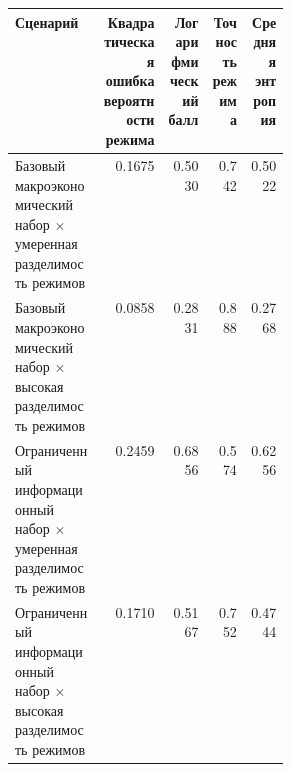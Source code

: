 \begin{tabular}{p{0.32\linewidth}rrrr}
\toprule
Сценарий & Квадратическая ошибка вероятности режима & Логарифмический балл & Точность режима & Средняя энтропия \\
\midrule
Базовый макроэкономический набор × умеренная разделимость режимов & 0.1675 & 0.5030 & 0.742 & 0.5022 \\
Базовый макроэкономический набор × высокая разделимость режимов & 0.0858 & 0.2831 & 0.888 & 0.2768 \\
Ограниченный информационный набор × умеренная разделимость режимов & 0.2459 & 0.6856 & 0.574 & 0.6256 \\
Ограниченный информационный набор × высокая разделимость режимов & 0.1710 & 0.5167 & 0.752 & 0.4744 \\
\bottomrule
\end{tabular}